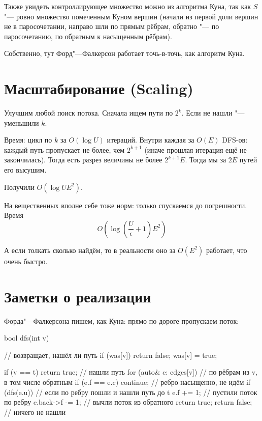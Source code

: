 Также увидеть контроллирующее множество можно из алгоритма Куна, так как $S$ "--- ровно множество помеченным Куном вершин
(начали из первой доли вершин не в паросочетании, направо шли по прямым рёбрам, обратно "--- по паросочетанию, по обратным к насыщенным рёбрам).

Собственно, тут Форд"---Фалкерсон работает точь-в-точь, как алгоритм Куна.

\section{Масштабирование (Scaling)}

Улучшим любой поиск потока. Сначала ищем пути по $2^k$. Если не нашли "--- уменьшили $k$.

Время: цикл по $k$ за $O(\log U)$ итераций.
Внутри каждая за $O(E)$ DFS-ов: каждый путь пропускает не более, чем $2^{k+1}$ (иначе прошлая итерация ещё не закончилась).
Тогда есть разрез величины не более $2^{k+1}E$.
Тогда мы за $2E$ путей его высушим.

Получили $O(\log U E^2)$.

На вещественных вполне себе тоже норм: только спускаемся до погрешности.
Время
\[ O\left(\log \left(\frac{U}{\epsilon}+1\right) E^2\right) \]

А если толкать сколько найдём, то в реальности оно за $O(E^2)$ работает, что очень быстро.

\section{Заметки о реализации}

Форда"---Фалкерсона пишем, как Куна: прямо по дороге пропускаем поток:
\begin{cppcode}
bool dfs(int v) { // возвращает, нашёл ли путь
	if (was[v]) return false;
	was[v] = true;

	if (v == t) return true; // нашли путь
	for (auto& e: edges[v]) { // по рёбрам из v, в том числе обратным
		if (e.f == e.c) continue; // ребро насыщенно, не идём
		if (dfs(e.u)) { // если по ребру пошли и нашли путь до t
			e.f += 1; // пустили поток по ребру
			e.back->f -= 1; // вычли поток из обратного
			return true;
		}
	}
	return false; // ничего не нашли
}
\end{cppcode}